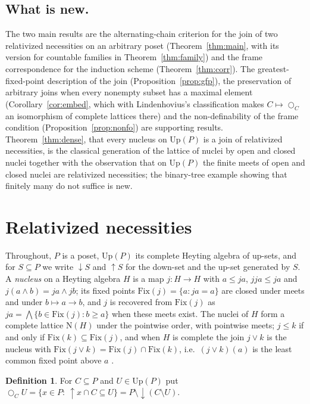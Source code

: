 \documentclass[11pt]{amsart}
\theoremstyle{definition}
\newtheorem{defi}[thm]{Definition}
\newcommand{\Fix}{\mathrm{Fix}}
\newcommand{\Up}{\mathrm{Up}}
\newcommand{\Nuc}{\mathrm{N}}
\newcommand{\lax}{\bigcirc}
\newcommand{\dn}{{\downarrow}}
\newcommand{\upa}{{\uparrow}}
\begin{document}
\subsection*{What is new.}
The two main results are the alternating-chain criterion for the join of two
relativized necessities on an arbitrary poset (Theorem~\ref{thm:main}, with
its version for countable families in Theorem~\ref{thm:family}) and the
frame correspondence for the induction scheme (Theorem~\ref{thm:corr}). The
greatest-fixed-point description of the join (Proposition~\ref{prop:gfp}),
the preservation of arbitrary joins when every nonempty subset has a maximal
element (Corollary~\ref{cor:embed}, which with Lindenhovius's classification
makes $C\mapsto\lax_C$ an isomorphism of complete lattices there) and the
non-definability of the frame condition (Proposition~\ref{prop:nonfo}) are
supporting results. Theorem~\ref{thm:dense}, that every nucleus on $\Up(P)$
is a join of relativized necessities, is the classical generation of the
lattice of nuclei by open and closed nuclei \cite{Johnstone} together with
the observation that on $\Up(P)$ the finite meets of open and closed nuclei
are relativized necessities; the binary-tree example showing that finitely
many do not suffice is new.

\section{Relativized necessities}\label{sec:rel}

Throughout, $P$ is a poset, $\Up(P)$ its complete Heyting algebra of up-sets,
and for $S\subseteq P$ we write $\dn S$ and $\upa S$ for the down-set and the
up-set generated by $S$. A \emph{nucleus} on a Heyting algebra $H$ is a map
$j\colon H\to H$ with $a\le ja$, $jja\le ja$ and $j(a\wedge b)=ja\wedge jb$;
its fixed points $\Fix(j)=\{a:ja=a\}$ are closed under meets and under
$b\mapsto a\to b$, and $j$ is recovered from $\Fix(j)$ as
$ja=\bigwedge\{b\in\Fix(j):b\ge a\}$ when these meets exist. The nuclei of
$H$ form a complete lattice $\Nuc(H)$ under the pointwise order, with
pointwise meets; $j\le k$ if and only if $\Fix(k)\subseteq\Fix(j)$, and
when $H$ is complete the join $j\vee k$ is the nucleus with
$\Fix(j\vee k)=\Fix(j)\cap\Fix(k)$, i.e.\ $(j\vee k)(a)$ is the least common
fixed point above $a$ \cite{Macnab,Escardo}.

\begin{defi}
For $C\subseteq P$ and $U\in\Up(P)$ put
$\lax_CU=\{x\in P:\ \upa x\cap C\subseteq U\}=P\setminus\dn(C\setminus U)$.
\end{defi}
\end{document}
